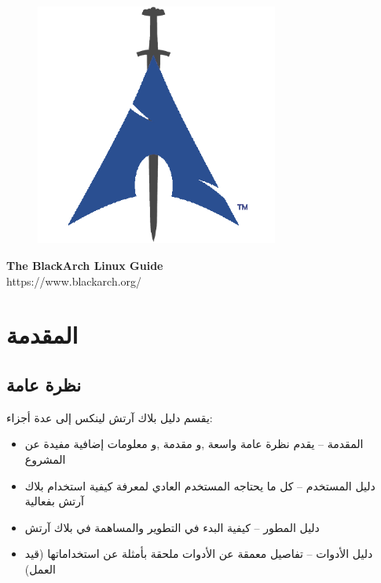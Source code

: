 \documentclass[a4paper, oneside, 11pt]{book}
\begin{document}
\pagestyle{empty}
\begin{center}
\begin{figure}[htbp]
\centering
\vspace{0.5cm}
\includegraphics[width=8cm]{images/logo.png}
\label{fig:logo}
\end{figure}
\vspace{0.5cm}
\Huge{\textbf{The BlackArch Linux Guide}}\\
\vspace{1cm}
\Large{\color{blue}https://www.blackarch.org/}\\
\vspace{0.5cm}
\end{center}
\newpage
\tableofcontents
\newpage
\pagestyle{fancy}


\chapter{المقدمة }

\section{نظرة عامة }
يقسم دليل بلاك آرتش لينكس إلى عدة أجزاء:

\begin{itemize}
\item 	المقدمة – يقدم نظرة عامة واسعة ,و مقدمة ,و معلومات إضافية مفيدة عن المشروع 
\item 	دليل المستخدم – كل ما يحتاجه المستخدم العادي لمعرفة كيفية استخدام بلاك آرتش بفعالية 
\item 	دليل المطور – كيفية البدء في التطوير والمساهمة في بلاك آرتش
\item 	دليل الأدوات – تفاصيل معمقة عن الأدوات ملحقة بأمثلة عن استخداماتها (قيد العمل)  
\end{itemize}
\end{document}
